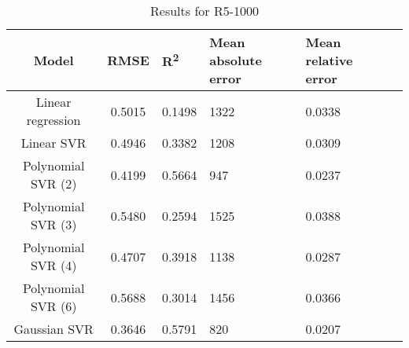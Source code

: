 \begin{table}[H]
\centering
\begin{adjustbox}{center}
\begin{tabular}{c | c M{1.2cm} M{2.5cm} M{2.5cm} M{1.8cm}}
Model & RMSE & R\textsuperscript{2} & Mean absolute error & Mean relative error \tabularnewline
\hline
Linear regression & 0.5015 & 0.1498 &   1322 & 0.0338 \\
Linear SVR & 0.4946 & 0.3382 &   1208 & 0.0309 \\
Polynomial SVR (2) & 0.4199 & 0.5664 &    947 & 0.0237 \\
Polynomial SVR (3) & 0.5480 & 0.2594 &   1525 & 0.0388 \\
Polynomial SVR (4) & 0.4707 & 0.3918 &   1138 & 0.0287 \\
Polynomial SVR (6) & 0.5688 & 0.3014 &   1456 & 0.0366 \\
Gaussian SVR & 0.3646 & 0.5791 &    820 & 0.0207 \\
\end{tabular}
\end{adjustbox}
\\
\caption{Results for R5-1000}
\label{tab:coreonly_linear_R5_1000}
\end{table}
